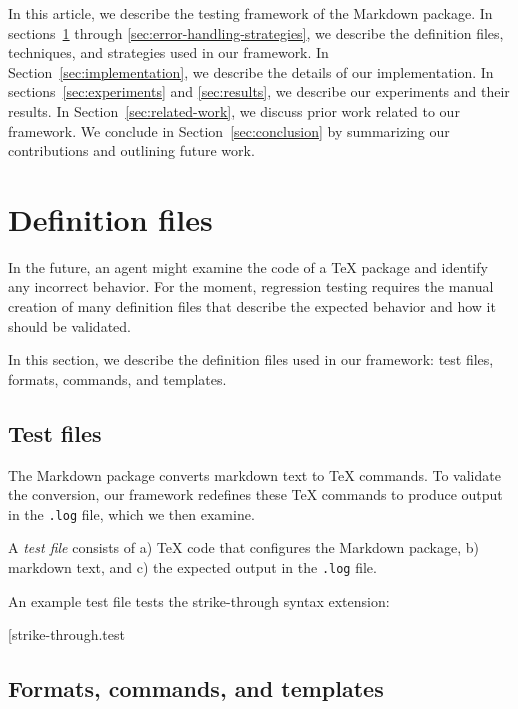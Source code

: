 \documentclass[final]{ltugboat}
\begin{document}
In this article, we describe the testing framework of the Markdown package. In sections~\ref{sec:definition-files} through \ref{sec:error-handling-strategies}, we describe the definition files, techniques, and strategies used in our framework. In Section~\ref{sec:implementation}, we describe the details of our implementation. In sections~\ref{sec:experiments} and \ref{sec:results}, we describe our experiments and their results. In Section~\ref{sec:related-work}, we discuss prior work related to our framework. We conclude in Section~\ref{sec:conclusion} by summarizing our contributions and outlining future work.

\section{Definition files}
\label{sec:definition-files}

In the future, an  agent might examine the code of a \TeX{} package and identify any incorrect behavior. For the moment, regression testing requires the manual creation of many definition files that describe the expected behavior and how it should be validated.

In this section, we describe the definition files used in our framework: test files, formats, commands, and templates.

\subsection{Test files}
\label{sec:test-files}

The Markdown package converts markdown text to \TeX{} commands. To validate the conversion, our framework redefines these \TeX{} commands to produce output in the \texttt{.log} file, which we then examine.

A \emph{test file} consists of a) \TeX{} code that configures the Markdown package, b) markdown text, and c) the expected output in the \texttt{.log} file.

An example test file  tests the strike-through syntax extension:

\smallskip
\noindent
\example*[{strike-through.test}

\subsection{Formats, commands, and templates}
\label{sec:formats-commands-and-templates}
\end{document}
